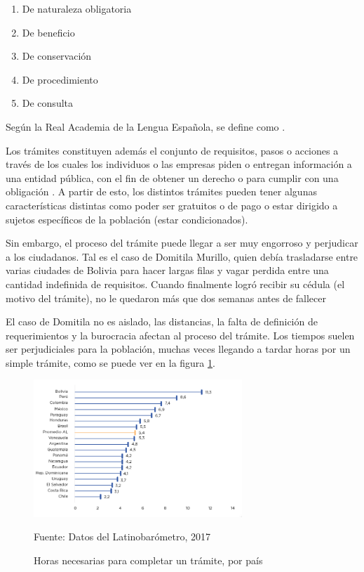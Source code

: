 \begin{enumerate}
    \item De naturaleza obligatoria
    \item De beneficio
    \item De conservación
    \item De procedimiento
    \item De consulta
\end{enumerate}

Según la Real Academia de la Lengua Española, se define como 
\parencite{asaleDiccionarioLenguaEspanola}.

Los trámites constituyen además el conjunto de requisitos, pasos o acciones a
través de los cuales los individuos o las empresas piden o entregan información
a una entidad pública, con el fin de obtener un derecho o para cumplir con una
obligación \cite{rosethFinTramiteEterno2018}. A partir de esto, los distintos
trámites pueden tener algunas características distintas como poder ser gratuitos
o de pago o estar dirigido a sujetos específicos de la población (estar
condicionados).

Sin embargo, el proceso del trámite puede llegar a ser muy engorroso y
perjudicar a los ciudadanos. Tal es el caso de Domitila Murillo, quien debía
trasladarse entre varias ciudades de Bolivia para hacer largas filas y vagar
perdida entre una cantidad indefinida de requisitos. Cuando finalmente logró
recibir su cédula (el motivo del trámite), no le quedaron más que dos semanas
antes de fallecer \cite{charoskyQuejaComoEnergia2014}

El caso de Domitila no es aislado, las distancias, la falta de definición de
requerimientos y la burocracia afectan al proceso del trámite. Los tiempos
suelen ser perjudiciales para la población, muchas veces llegando a tardar horas
por un simple trámite, como se puede ver en la figura \ref{fig:horastramite}.

\begin{figure}[htbp]
    \centering
    \includegraphics[width=0.7\textwidth]{assets/horastramite}
    \caption{Horas necesarias para completar un trámite, por país}{Fuente: Datos del Latinobarómetro, 2017}
    \label{fig:horastramite}
\end{figure}

